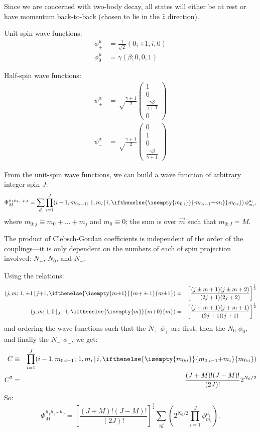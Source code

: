 \documentclass[a4paper]{article}
\newcommand{\fourvec}[4]{\ensuremath{\left(#1; #2, #3, #4\right)}}
\newcommand{\spinor}[4]{\begin{pmatrix}#1\\#2\\#3\\#4\end{pmatrix}}
\newcommand{\cg}[6]{(#1, #2;\, #3, #4\, |\, #5, \ifthenelse{\isempty{#6}}{#2{+}#4}{#6})}
\begin{document}
Since we are concerned with two-body decay, all states will either be
at rest or have momentum back-to-back (chosen to lie in the $\hat{z}$
direction).

Unit-spin wave functions:
\begin{align}
  \phi^\mu_\pm & = \frac{1}{\sqrt{2}}\fourvec{0}{\mp1}{i}{0} \\
  \phi^\mu_0   & = \gamma\fourvec{\beta}{0}{0}{1}
\end{align}

Half-spin wave functions:
\begin{align}
  \psi^\alpha_+ & = \sqrt\frac{\gamma+1}{2}\spinor{1}{0}{\frac{\gamma\beta}{\gamma+1}}{0}\\
  \psi^\alpha_- & = \sqrt\frac{\gamma+1}{2}\spinor{0}{1}{0}{\frac{\gamma\beta}{\gamma+1}}
\end{align}

From the unit-spin wave functions, we can build a wave function of
arbitrary integer spin $J$:
\begin{equation}
  \Phi^{\mu_1\mu_2\dots\mu_J}_{M} = \sum_{\vec{m}} \prod_{i=1}^{J} \cg{i-1}{m_{0:i{-}1}}{1}{m_i}{i}{m_{0:i}}\, \phi^{\mu_i}_{m_i},
\end{equation}
where $m_{0:j} \equiv m_0 + \dots + m_j$ and $m_0 \equiv 0$; the sum is over $\vec m$ such that $m_{0:J} = M$.

The product of Clebsch-Gordan coefficients is independent of the order
of the couplings---it is only dependent on the numbers of each of spin
projection involved: $N_+$, $N_0$, and $N_-$.

Using the relations:
\begin{eqnarray}
  \cg{j}{m}{1}{\pm1}{j{+}1}{m{\pm}1} & = & \left[\frac{(j\pm m+1)(j\pm m+2)}{(2j+1)(2j+2)}\right]^{\frac{1}{2}}\\
  \cg{j}{m}{1}{0}{j{+}1}{m} & = & \left[\frac{(j-m+1)(j+m+1)}{(2j+1)(j+1)}\right]^{\frac{1}{2}}
\end{eqnarray}
and ordering the wave functions such that the $N_+$ $\phi_+$ are
first, then the $N_0$ $\phi_0$, and finally the $N_-$ $\phi_-$, we get:
\begin{eqnarray}
  C & \equiv & \prod_{i=1}^{J} \cg{i-1}{m_{0:i{-}1}}{1}{m_i}{i}{m_{0:i}} \\
  C^2 & = & \frac{(J+M)!(J-M)!}{(2J)!}2^{N_0/2}
\end{eqnarray}
So:
\begin{equation}
  \Phi^{\mu_1\mu_2\dots\mu_J}_{M} = \left[\frac{(J+M)!(J-M)!}{(2J)!}\right]^{\frac{1}{2}} \sum_{\vec{m}}\left( 2^{N_0/2}\prod_{i=1}^{J}\phi^{\mu_i}_{m_i}\right).
\end{equation}
\end{document}
